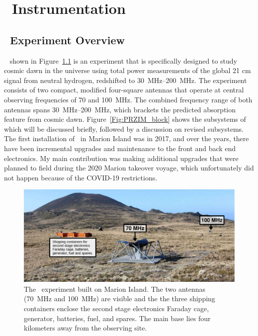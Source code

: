 \chapter{\prizm~Instrumentation}
\section{\prizm~Experiment Overview}

\prizm~\citep[]{2019JAI.....850004P} shown in Figure~\ref{Fig:prizm} is an experiment that is specifically designed to study cosmic dawn in the universe using total power measurements of the global 21 cm signal from neutral hydrogen, redshifted to \SIrange{30}{200}{\mega \hertz}. The experiment consists of two compact, modified four-square antennas \citep{8072391} that operate at central observing frequencies of 70 and 100~MHz. The combined frequency range of both antennas spans \SIrange{30}{200}{\mega \hertz}, which brackets the predicted absorption feature from cosmic dawn. Figure~\ref{Fig:PRZIM_block} shows the subsystems of \prizm\, which will be discussed briefly, followed by a discussion on revised subsystems. The first installation of \prizm\ in Marion Island was in 2017, and over the years, there have been incremental upgrades and maintenance to the front and back end electronics. My main contribution was making additional upgrades that were planned to field during the 2020 Marion takeover voyage, which unfortunately did not happen because of the COVID-19 restrictions.

\begin{figure}
	\centering
	\includegraphics[width=\linewidth]{Figures/prizm.pdf}
	\caption{The \prizm\ experiment built on Marion Island. The two antennas (\SI{70}{\mega \hertz} and \SI{100}{\mega \hertz}) are visible and the the three shipping containers enclose the second stage electronics Faraday cage, generator, batteries, fuel, and spares. The main base lies four kilometers away from the observing site.}
	\label{Fig:prizm}
\end{figure}

